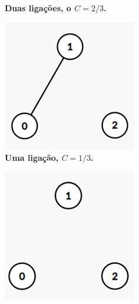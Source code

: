\documentclass[
12pt,        %
oneside,     %
a4paper,     %
english,       %
brazil        %
%
%
]{ppgca}
\begin{document}
\begin{figure}[H]
\begin{subfigure}[b]{0.4\textwidth}
        \centering
        \caption{\textbf{Duas ligações, o $C=2/3$.}}
        \label{fig:localcluster2}
    \end{subfigure}
    \vfill
    \begin{subfigure}[b]{0.4\textwidth}
        \includegraphics[width=\textwidth]{localcluster3.png}
        \centering
        \caption{\textbf{Uma ligação, $C=1/3$.}}
        \label{fig:localcluster3}
    \end{subfigure}
    \hfill
    \begin{subfigure}[b]{0.4\textwidth}
        \includegraphics[width=\textwidth]{localcluster4.png}

\end{subfigure}
\end{figure}
\end{document}
